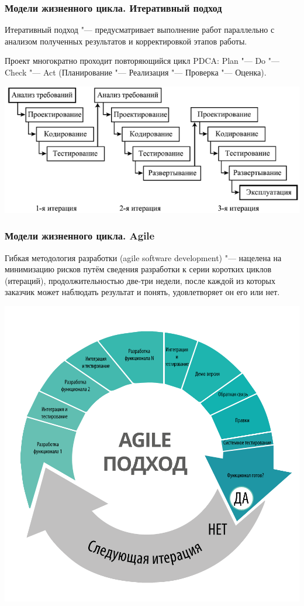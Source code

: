 \documentclass{../industrial-development}
\begin{document}
\begin{frame} \frametitle{Модели жизненного цикла. Итеративный подход}
	\alert{Итеративный подход} "--- предусматривает выполнение работ параллельно с анализом полученных результатов и корректировкой этапов работы.
	
	Проект многократно проходит повторяющийся цикл PDCA: Plan "--- Do "--- Check "--- Act (Планирование "--- Реализация "--- Проверка "--- Оценка).
	
	\centerline{\includegraphics[height=0.50\textheight]{image12.png}}
\end{frame}
\lecturenotes


\begin{frame} \frametitle{Модели жизненного цикла. Agile}
	\alert{Гибкая методология разработки} (agile software development) "--- нацелена на минимизацию рисков путём сведения разработки к серии коротких циклов (итераций), продолжительностью две-три недели, после каждой из которых заказчик может наблюдать результат и понять, удовлетворяет он его или нет.
	
	\centerline{\includegraphics[height=0.50\textheight]{image18.png}}
\end{frame}
\lecturenotes
\end{document}
